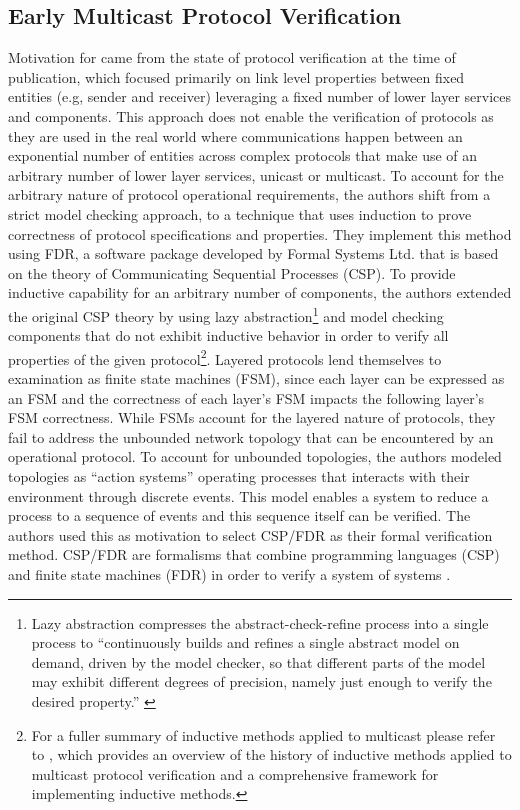 \documentclass[11pt, journal]{IEEEtran}
\begin{document}
\subsection{Early Multicast Protocol Verification}
Motivation for \cite{Creese1999} came from the state of protocol verification at the time of publication, which focused primarily on link level properties between fixed entities (e.g, sender and receiver) leveraging a fixed number of lower layer services and components. This approach does not enable the verification of protocols as they are used in the real world where communications happen between an exponential number of entities across complex protocols that make use of an arbitrary number of lower layer services, unicast or multicast. 
\bigbreak
To account for the arbitrary nature of protocol operational requirements, the authors shift from a strict model checking approach, to a technique that uses induction to prove correctness of protocol specifications and properties. They implement this method using FDR, a software package developed by Formal Systems Ltd. that is based on the theory of Communicating Sequential Processes (CSP). To provide inductive capability for an arbitrary number of components, the authors extended the original CSP theory by using lazy abstraction\footnote{Lazy abstraction compresses the abstract-check-refine process into a single process to ``continuously builds and refines a single abstract model on demand, driven by the model checker, so that different parts of the model may exhibit different degrees of precision, namely just enough to verify the desired property.'' \cite{Henzinger2002}} and model checking components that do not exhibit inductive behavior in order to verify all properties of the given protocol\footnote{For a fuller summary of inductive methods applied to multicast please refer to \cite{Martina2015}, which provides an overview of the history of inductive methods applied to multicast protocol verification and a comprehensive framework for implementing inductive methods.}.
\bigbreak
Layered protocols lend themselves to examination as finite state machines (FSM), since each layer can be expressed as an FSM and the correctness of each layer's FSM impacts the following layer's FSM correctness. While FSMs account for the layered nature of protocols, they fail to address the unbounded network topology that can be encountered by an operational protocol. To account for unbounded topologies, the authors modeled topologies as ``action systems'' operating processes that interacts with their environment through discrete events. This model enables a system to reduce a process to a sequence of events and this sequence itself can be verified. The authors used this as motivation to select CSP/FDR as their formal verification method. CSP/FDR are formalisms that combine programming languages (CSP) and finite state machines (FDR) in order to verify a system of systems \cite{Henzinger2002}.
\end{document}
